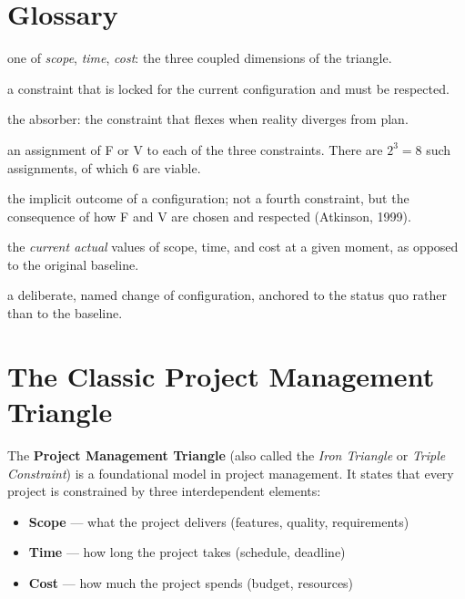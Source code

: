 \documentclass[11pt,a4paper]{article}
\begin{document}
\section{Glossary}
\label{sec:glossary}

\begin{description}[leftmargin=*]
  \item[Constraint] one of \emph{scope}, \emph{time}, \emph{cost}: the
  three coupled dimensions of the triangle.
  \item[Fixed (F)] a constraint that is locked for the current
  configuration and must be respected.
  \item[Variable (V)] the absorber: the constraint that flexes when
  reality diverges from plan.
  \item[Configuration] an assignment of F or V to each of the three
  constraints. There are $2^3 = 8$ such assignments, of which 6 are
  viable.
  \item[Quality] the implicit outcome of a configuration; not a fourth
  constraint, but the consequence of how F and V are chosen and respected
  (Atkinson, 1999).
  \item[Status quo] the \emph{current actual} values of scope, time, and
  cost at a given moment, as opposed to the original baseline.
  \item[Pivot] a deliberate, named change of configuration, anchored to
  the status quo rather than to the baseline.
\end{description}

\section{The Classic Project Management Triangle}
\label{sec:classic}

The \textbf{Project Management Triangle} (also called the \emph{Iron
Triangle} or \emph{Triple Constraint}) is a foundational model in
project management. It states that every project is constrained by three
interdependent elements:

\begin{itemize}[leftmargin=*]
  \item \textbf{Scope} --- what the project delivers (features, quality,
  requirements)
  \item \textbf{Time} --- how long the project takes (schedule, deadline)
  \item \textbf{Cost} --- how much the project spends (budget, resources)
\end{itemize}
\end{document}
